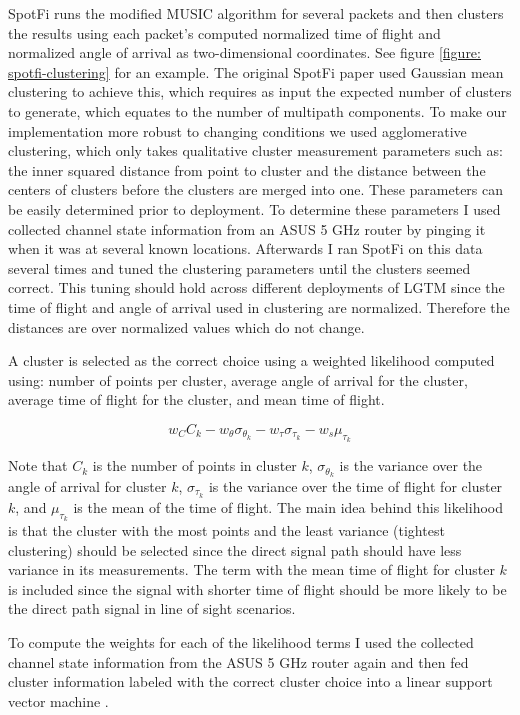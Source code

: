 \documentclass[12pt]{report}
\begin{document}
SpotFi runs the modified MUSIC algorithm for several packets and then clusters the results using each packet's computed normalized time of flight and normalized angle of arrival as two-dimensional coordinates. See figure \ref{figure: spotfi-clustering} for an example. The original SpotFi paper used Gaussian mean clustering to achieve this, which requires as input the expected number of clusters to generate, which equates to the number of multipath components. To make our implementation more robust to changing conditions we used agglomerative clustering, which only takes qualitative cluster measurement parameters such as: the inner squared distance from point to cluster and the distance between the centers of clusters before the clusters are merged into one. These parameters can be easily determined prior to deployment. To determine these parameters I used collected channel state information from an ASUS 5 GHz router by pinging it when it was at several known locations. Afterwards I ran SpotFi on this data several times and tuned the clustering parameters until the clusters seemed correct. This tuning should hold across different deployments of LGTM since the time of flight and angle of arrival used in clustering are normalized. Therefore the distances are over normalized values which do not change. \par

A cluster is selected as the correct choice using a weighted likelihood computed using: number of points per cluster, average angle of arrival for the cluster, average time of flight for the cluster, and mean time of flight. 

$$w_{C} C_k - w_{\theta} \sigma_{\theta_{k}} - w_{\tau} \sigma_{\tau_{k}} - w_{s} \mu_{\tau_{k}}$$

Note that $C_k$ is the number of points in cluster $k$, $\sigma_{\theta_{k}}$ is the variance over the angle of arrival for cluster $k$, $\sigma_{\tau_{k}}$ is the variance over the time of flight for cluster $k$, and $\mu_{\tau_{k}}$ is the mean of the time of flight. The main idea behind this likelihood is that the cluster with the most points and the least variance (tightest clustering) should be selected since the direct signal path should have less variance in its measurements. The term with the mean time of flight for cluster $k$ is included since the signal with shorter time of flight should be more likely to be the direct path signal in line of sight scenarios. \par

To compute the weights for each of the likelihood terms I used the collected channel state information from the ASUS 5 GHz router again and then fed cluster information labeled with the correct cluster choice into a linear support vector machine \cite{SvmTutorialBurges1998}. \par
\end{document}
